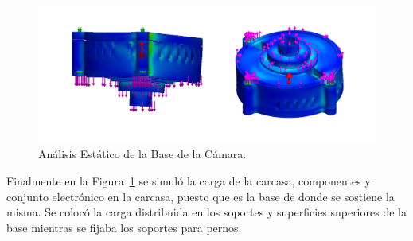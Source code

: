     \begin{figure}[H]
    \centering
    \begin{adjustbox}{width=\linewidth} \includegraphics{media/analisisEstatico/simulacion_base.png}
    \end{adjustbox}
    \caption{\label{fig:simBase} Análisis Estático de la Base de la Cámara.}
    \end{figure} 
    
    Finalmente en la Figura~\ref{fig:simBase} se simuló la carga de la carcasa, componentes y conjunto electrónico en la carcasa, puesto que es la base de donde se sostiene la misma. Se colocó la carga distribuida en los soportes y superficies superiores de la base mientras se fijaba los soportes para pernos.